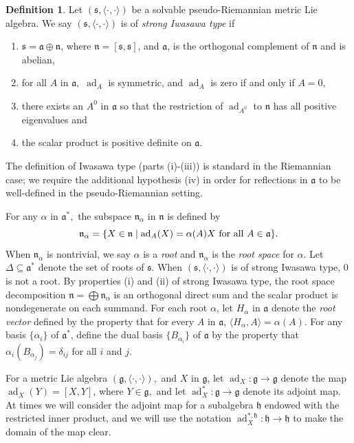 \documentclass[12pt]{amsart}
\newcommand{\la}{\langle}
\newcommand{\ra}{\rangle}
\newcommand{\fraka}{\ensuremath{\mathfrak{a}} }
\newcommand{\frakg}{\ensuremath{\mathfrak{g}} }
\newcommand{\frakh}{\ensuremath{\mathfrak{h}} }
\newcommand{\frakn}{\ensuremath{\mathfrak{n}} }
\newcommand{\fraks}{\ensuremath{\mathfrak{s}} }
\renewcommand\a{{\mathfrak{a}}}
\newcommand\n{{\mathfrak{n}}}
\newcommand\s{{\mathfrak{s}}}
\newcommand\ip{{\langle\cdot {,} \cdot\rangle}}
\newcommand\ad{\operatorname{ad}}
\theoremstyle{plain}
\theoremstyle{definition}
\newtheorem{definition}[theorem]{Definition}
\theoremstyle{remark}
\numberwithin{equation}{section}
\numberwithin{theorem}{section}
\begin{document}
\begin{definition}\label{defn: Iwasawa} 
Let $(\fraks, \ip)$ be a  solvable pseudo-Riemannian  metric Lie algebra. 
We say $(\fraks, \ip)$ is of   {\em strong Iwasawa type} if
\begin{enumerate}
\item  $\fraks = \fraka \oplus \frakn$, where  $\n = [\s, \s]$, and $\a$, is the orthogonal complement of $\n$ and is abelian, 
\item for all $A$ in $\fraka,$  $\ad_A$ is symmetric, and $\ad_A$ is zero if and only if $A=0$, 
  \item there exists an $A^0$ in $\fraka$ so that  the restriction of $\ad_{A^0}$ to $\frakn$ has  all positive eigenvalues 
  and
\item the scalar product is positive definite on $\fraka.$
\end{enumerate} 
\end{definition}
The definition of Iwasawa type (parts (i)-(iii)) is standard in the Riemannian case; we require the additional hypothesis (iv) in order for reflections in $\fraka$ to be well-defined in the pseudo-Riemannian setting. 

For any $\alpha$ in $\fraka^\ast,$  the subspace $\frakn_\alpha$ in $\n$ is defined by
\[ \n_{\alpha} = \{X \in \n \mid \ad_A(X) = \alpha(A) X ~{\rm for~all} ~
A\in\a \}.\] 
When $\n_{\alpha} $ is nontrivial, we say $\alpha$ is a {\em root} and $\frakn_\alpha$ 
is the {\em root space} for $\alpha$.  
Let $\Delta \subseteq\fraka^*$ denote the set of roots of 
$\s$.
When $(\fraks, \ip)$ is of
strong Iwasawa type, $0$ is not a root.
By properties (i) and (ii)
of strong Iwasawa type, the root space decomposition  $\n = \bigoplus \n_\alpha$ is an orthogonal direct sum 
and the scalar product is  nondegenerate on each summand.  
For each
root $\alpha$, let $H_\alpha$ in $\fraka$ denote the {\em root
vector}  defined by the property that for every $A$ in $\a$, $\la H_\alpha, A \ra = \alpha(A)$.
For  any basis $\{\alpha_i \}$ of $\fraka^\ast$, define the dual  basis  $\{ B_{\alpha_i}\}$ of $\a$  by the property that 
$\alpha_i(B_{\alpha_j}) = \delta_{ij}$ for all $i$ and $j$.

For a metric Lie algebra $(\frakg, \ip),$ and $X$ in $\frakg$, let
$\ad_X: \frakg \to \frakg$ denote the map  $\ad_X (Y) = [X,Y]$, where
 $Y \in \frakg,$ and let $\ad_X^\ast: \frakg \to \frakg$ denote its
adjoint map.  At times we will consider the adjoint map for a subalgebra
$\frakh$ endowed with the restricted inner product, and we will use
the notation $\ad_X^{\ast,\frakh}: \frakh \to \frakh$ to make  the domain of
the map clear.
\end{document}
